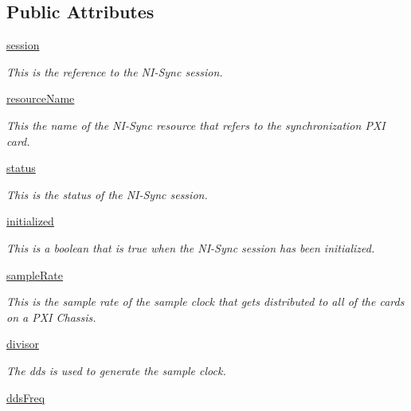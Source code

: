 \subsection*{Public Attributes}
\begin{DoxyCompactItemize}
\item 
\hyperlink{class_timing_1_1_timing_ac6ffaf6ca94b488dba1c56a780b01cfb}{session}
\begin{DoxyCompactList}\small\item\em This is the reference to the N\-I-\/\-Sync session. \end{DoxyCompactList}\item 
\hyperlink{class_timing_1_1_timing_a8ce8605fb1b55c4a7a0db05c6b1a551c}{resource\-Name}
\begin{DoxyCompactList}\small\item\em This the name of the N\-I-\/\-Sync resource that refers to the synchronization P\-X\-I card. \end{DoxyCompactList}\item 
\hyperlink{class_timing_1_1_timing_aa54e754e141f10df585dbe3bf86729ef}{status}
\begin{DoxyCompactList}\small\item\em This is the status of the N\-I-\/\-Sync session. \end{DoxyCompactList}\item 
\hyperlink{class_timing_1_1_timing_a802c666b56edd255e17036d5317af75c}{initialized}
\begin{DoxyCompactList}\small\item\em This is a boolean that is true when the N\-I-\/\-Sync session has been initialized. \end{DoxyCompactList}\item 
\hyperlink{class_timing_1_1_timing_a645c0a6e372274c15036da2cdd81ce51}{sample\-Rate}
\begin{DoxyCompactList}\small\item\em This is the sample rate of the sample clock that gets distributed to all of the cards on a P\-X\-I Chassis. \end{DoxyCompactList}\item 
\hyperlink{class_timing_1_1_timing_acb98ae4190c94c258c1f86060ab27a86}{divisor}
\begin{DoxyCompactList}\small\item\em The dds is used to generate the sample clock. \end{DoxyCompactList}\item 
\hyperlink{class_timing_1_1_timing_a6df1c9bf5ff79f8f93242f2f52d5c38a}{dds\-Freq}

\end{DoxyCompactItemize}
